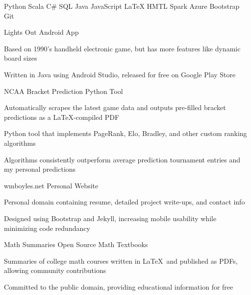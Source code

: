 \documentclass[a4paper]{awesome-cv}
\begin{document}
	
	\begin{cvparagraph}	
		{ Python } \textbar 
		{ Scala } \textbar
		{ C\# } \textbar 
		{ SQL } \textbar
		{ Java } \textbar
		{ JavaScript } \textbar 
		{ \LaTeX } \textbar
		{ HMTL } \newline\newline
		{ Spark } \textbar
		{ Azure } \textbar
		{ Bootstrap } \textbar
		{ Git }
	\end{cvparagraph}
	
	\begin{cventries}
		\cvprojectentry
		{Lights Out} %
		{Android App} %
		{
			\begin{cvitems} %
				\item {Based on 1990’s handheld electronic game, but has more features like dynamic board sizes}
				\item {Written in Java using Android Studio, released for free on Google Play Store}
			\end{cvitems}
		}
	
		\cvprojectentry
		{NCAA Bracket Prediction} %
		{Python Tool} %
		{
			\begin{cvitems} %
				\item {Automatically scrapes the latest game data and outputs pre-filled bracket predictions as a \LaTeX-compiled PDF}
				\item {Python tool that implements PageRank, Elo, Bradley, and other custom ranking algorithms}
				\item {Algorithms consistently outperform average prediction tournament entries and my personal predictions}
			\end{cvitems}
		}
	
		\cvprojectentry
		{wmboyles.net} %
		{Personal Website} %
		{
			\begin{cvitems} %
				\item {Personal domain containing resume, detailed project write-ups, and contact info}
				\item {Designed using Bootstrap and Jekyll, increasing mobile usability while minimizing code redundancy}
			\end{cvitems}
		}
	
		\cvprojectentry
		{Math Summaries} %
		{Open Source Math Textbooks} %
		{
			\begin{cvitems} %
				\item {Summaries of college math courses written in \LaTeX ~and published as PDFs, allowing community contributions}
				\item {Committed to the public domain, providing educational information for free}
			\end{cvitems}
		}
	\end{cventries}
\end{document}
